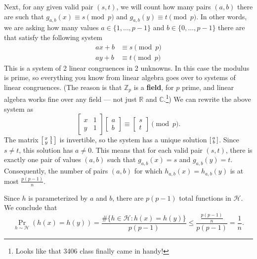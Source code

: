 \documentclass[14pt]{extreport}
\begin{document}
    Next, for any given valid pair \((s, t)\), we will count how many pairs \((a, b)\) there are such that \(g_{a,b}(x) \equiv s \pmod{p}\) and \(g_{a,b}(y) \equiv t \pmod{p}\). In other words, we are asking how many values \(a \in \{1, \ldots, p - 1\}\) and \(b \in \{0, \ldots, p - 1\}\) there are that satisfy the following system
    \begin{align*}
        ax + b &\equiv s \pmod{p} \\
        ay + b &\equiv t \pmod{p}
    \end{align*}
    This is a system of 2 linear congruences in 2 unknowns. In this case the modulus is prime, so everything you know from linear algebra goes over to systems of linear congruences. (The reason is that $\mathbb{Z}_{p}$ is a \textbf{field}, for $p$ prime, and linear algebra works fine over any field — not just $\mathbb{R}$ and $\mathbb{C}$.\footnote{Looks like that 3406 class finally came in handy!}) We can rewrite the above system as 
    $$
    \begin{bmatrix}
        x & 1 \\
        y & 1
    \end{bmatrix}
    \begin{bmatrix}
        a \\
        b
    \end{bmatrix}
    \equiv
    \begin{bmatrix}
        s \\
        t
    \end{bmatrix}
    \pmod{p}.
    $$
    The matrix $\begin{bsmallmatrix}
        x & 1 \\
        y & 1
    \end{bsmallmatrix}$ is invertible, so the system has a unique solution
    $\begin{bsmallmatrix}
        a \\
        b
    \end{bsmallmatrix}$. Since $s \ne t$, this solution has $a \ne 0$. This means that for each valid pair \((s,t)\), there is exactly one pair of values \((a, b)\) such that \(g_{a,b}(x) = s\) and \(g_{a,b}(y) = t\). Consequently, the number of pairs \((a, b)\) for which \(h_{a,b}(x) = h_{a,b}(y)\) is at most \(\frac{p(p - 1)}{n}\).

    \vspace{2mm}
    Since $h$ is parameterized by $a$ and $b$, there are $p(p - 1)$ total functions in $\mathcal{H}$. We conclude that $$\Pr_{h \sim \mathcal{H}} (h(x) = h(y)) = \frac{\#\{h \in \mathcal{H} : h(x) = h(y) \}}{p(p - 1)} \le \frac{\frac{p(p - 1)}{n}}{p(p - 1)} = \frac{1}{n}.$$
\end{document}
